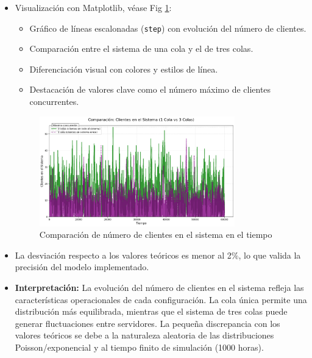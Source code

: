 \documentclass{article}
\begin{document}
\begin{itemize}
\begin{itemize}
            \item Visualización con Matplotlib, véase Fig \ref{fig:clientes_sistema}:
                \begin{itemize}
                    \item Gráfico de líneas escalonadas (\texttt{step}) con evolución del número de clientes.
                    \item Comparación entre el sistema de una cola y el de tres colas.
                    \item Diferenciación visual con colores y estilos de línea.
                    \item Destacación de valores clave como el número máximo de clientes concurrentes.
                \end{itemize}
                \begin{figure}[h]
                    \centering
                    \includegraphics[width=0.8\textwidth]{./images/Numero de clientes en sistema.png}
                    \caption{Comparación de número de clientes en el sistema en el tiempo}
                    \label{fig:clientes_sistema}
                \end{figure}

            \newpage
            
            \item La desviación respecto a los valores teóricos es menor al 2\%, lo que valida la precisión del modelo implementado.
        
            \item \textbf{Interpretación:} La evolución del número de clientes en el sistema refleja las características operacionales de cada configuración. La cola única permite una distribución más equilibrada, mientras que el sistema de tres colas puede generar fluctuaciones entre servidores. La pequeña discrepancia con los valores teóricos se debe a la naturaleza aleatoria de las distribuciones Poisson/exponencial y al tiempo finito de simulación (1000 horas).
        \end{itemize}
\end{itemize}
\end{document}
